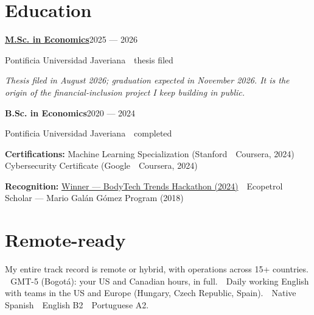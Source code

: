 \documentclass[a4paper,10pt]{article}
\newcommand{\headline}[2]{\needspace{3\baselineskip}\textbf{\color{ink}#1}\hfill{\small #2}\par}
\begin{document}
\section*{Education}
\headline{\href{https://davirson.com/en/research/fintech-inclusion}{M.Sc. in Economics}}{2025 --- 2026}
{\small Pontificia Universidad Javeriana \,\textperiodcentered\, thesis filed}\par
{\small\itshape Thesis filed in August 2026; graduation expected in November 2026. It is the origin of the financial-inclusion project I keep building in public.}\par
\vspace{1pt}
\headline{B.Sc. in Economics}{2020 --- 2024}
{\small Pontificia Universidad Javeriana \,\textperiodcentered\, completed}\par
\vspace{1pt}
\vspace{3pt}
\textbf{\color{ink}Certifications:} Machine Learning Specialization (Stanford \,\textperiodcentered\, Coursera, 2024) \,\textperiodcentered\, Cybersecurity Certificate (Google \,\textperiodcentered\, Coursera, 2024)\par\vspace{3pt}
\textbf{\color{ink}Recognition:} \href{https://public.tableau.com/app/profile/davirson.novoa/viz/BodyTrendsADataAnalysisProject/TrendsAnalysis}{Winner --- BodyTech Trends Hackathon (2024)} \,\textperiodcentered\, Ecopetrol Scholar --- Mario Galán Gómez Program (2018)\par

\section*{Remote-ready}
My entire track record is remote or hybrid, with operations across 15+ countries. \,\textperiodcentered\, GMT-5 (Bogotá): your US and Canadian hours, in full. \,\textperiodcentered\, Daily working English with teams in the US and Europe (Hungary, Czech Republic, Spain). \,\textperiodcentered\, Native Spanish \,\textperiodcentered\, English B2 \,\textperiodcentered\, Portuguese A2.
\end{document}
